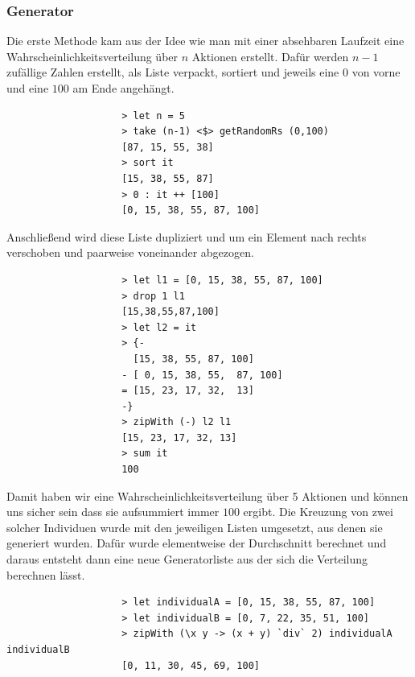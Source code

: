             \subsubsection*{Generator}
            Die erste Methode kam aus der Idee wie man mit einer absehbaren Laufzeit eine Wahrscheinlichkeitsverteilung über $n$ Aktionen erstellt. Dafür werden $n-1$ zufällige Zahlen erstellt, als Liste verpackt, sortiert und jeweils eine $0$ von vorne und eine $100$ am Ende angehängt.

            \begin{verbatim}
                    > let n = 5
                    > take (n-1) <$> getRandomRs (0,100)
                    [87, 15, 55, 38]
                    > sort it
                    [15, 38, 55, 87]
                    > 0 : it ++ [100]
                    [0, 15, 38, 55, 87, 100]
            \end{verbatim}

            \noindent
            Anschließend wird diese Liste dupliziert und um ein Element nach rechts verschoben und paarweise voneinander abgezogen.
            \begin{verbatim}
                    > let l1 = [0, 15, 38, 55, 87, 100]
                    > drop 1 l1
                    [15,38,55,87,100]
                    > let l2 = it
                    > {-
                      [15, 38, 55, 87, 100]
                    - [ 0, 15, 38, 55,  87, 100]
                    = [15, 23, 17, 32,  13]
                    -}
                    > zipWith (-) l2 l1
                    [15, 23, 17, 32, 13]
                    > sum it
                    100
            \end{verbatim}

            \noindent
            Damit haben wir eine Wahrscheinlichkeitsverteilung über 5 Aktionen und können uns sicher sein dass sie aufsummiert immer $100$ ergibt. Die Kreuzung von zwei solcher Individuen wurde mit den jeweiligen Listen umgesetzt, aus denen sie generiert wurden. Dafür wurde elementweise der Durchschnitt berechnet und daraus entsteht dann eine neue Generatorliste aus der sich die Verteilung berechnen lässt.

            \begin{verbatim}
                    > let individualA = [0, 15, 38, 55, 87, 100]
                    > let individualB = [0, 7, 22, 35, 51, 100]
                    > zipWith (\x y -> (x + y) `div` 2) individualA individualB
                    [0, 11, 30, 45, 69, 100]
            \end{verbatim}

